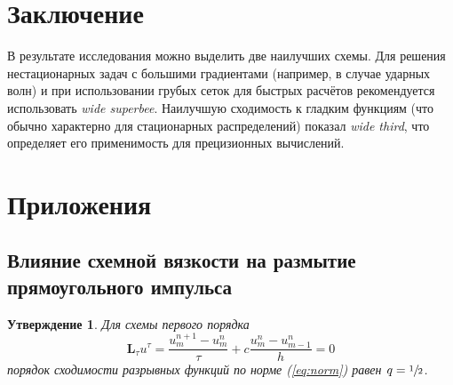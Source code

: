 \documentclass[a4paper,10pt]{article}
\begin{document}
\section{Заключение}
В результате исследования можно выделить две наилучших схемы.
Для решения нестационарных задач с большими градиентами (например, в случае ударных волн)
и при использовании грубых сеток для быстрых расчётов рекомендуется использовать \textit{wide superbee}.
Наилучшую сходимость к гладким функциям (что обычно характерно для стационарных распределений) показал \textit{wide third},
что определяет его применимость для прецизионных вычислений.

\newpage
\section{Приложения}
\subsection{Влияние схемной вязкости на размытие прямоугольного импульса}\label{sec:viscosity}
\newtheorem{schemevis}{Утверждение}
\begin{schemevis}
Для схемы первого порядка
\[ \mathbf{L}_\tau u^\tau = \frac{u_m^{n+1}-u_m^n}{\tau} + c\frac{u_m^n-u_{m-1}^n}{h}=0 \]
порядок сходимости разрывных функций по норме (\ref{eq:norm}) равен \( q=\sfrac1{2} \).
\end{schemevis}
\end{document}
